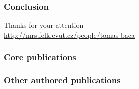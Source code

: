 \documentclass[aspectratio=169]{beamer}
\begin{document}

\begin{frame}
  \frametitle{Conclusion}

  \begin{center}
    \huge Thanks for your attention\\
    \vspace{1em}
    \large \url{http://mrs.felk.cvut.cz/people/tomas-baca}
  \end{center}

\end{frame}



\DeclareCiteCommand{\fullcite}
{}
{%
  \usedriver
  {%
  }
{}}
{\multicitedelim}
{}

\begin{frame}
  \frametitle{Core publications}
  \tiny{
    \printbibliography[keyword={mine},keyword={phd_related},keyword={core},heading=none,title={}]
  }
\end{frame}

\begin{frame}[allowframebreaks]
  \frametitle{Other authored publications}
  \tiny{
    \printbibliography[keyword={mine},notkeyword={core},heading=none,title={}]
  }
\end{frame}



\end{document}
